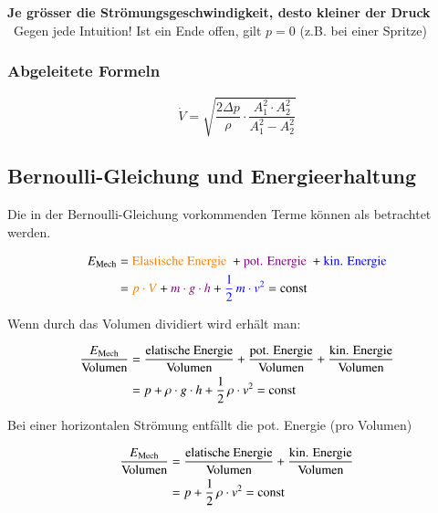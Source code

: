 \textbf{Je grösser die Strömungsgeschwindigkeit, desto kleiner der Druck} \\
\textrightarrow\ Gegen jede Intuition!
Ist ein Ende offen, gilt $p=0$ (z.B. bei einer Spritze)

\subsubsection*{Abgeleitete Formeln}

$$\dot{V} = \sqrt{\frac{2\Delta p}{\rho} \cdot \frac{A_1^2\cdot A_2^2}{A_1^2 - A_2^2}}$$

\subsection{Bernoulli-Gleichung und Energieerhaltung}

Die in der Bernoulli-Gleichung vorkommenden Terme können als  betrachtet werden.
\vspace{-0.3cm}

\begin{align*}
	E_{\rm Mech}	&= \text{\color{orange}Elastische Energie } + \text{\color{violet}pot. Energie } + \text{\color{blue}kin. Energie} \\
					&= {\color{orange}p \cdot V} + {\color{violet}m \cdot g \cdot h} + {\color{blue}\frac{1}{2} \, m \cdot v^2} = \mathop{} \! \mathrm{const}
\end{align*}

Wenn durch das Volumen dividiert wird erhält man: 

\vspace{-0.3cm}

\begin{align*}
	\frac{E_{\rm Mech}}{\text{Volumen}}	&= \frac{\text{elatische Energie}}{\text{Volumen}} + \frac{\text{pot. Energie}}{\text{Volumen}} + \frac{\text{kin. Energie}}{\text{Volumen}} \\
										&= p + \rho \cdot g \cdot h + \frac{1}{2} \, \rho \cdot v^2 = \mathop{} \! \mathrm{const}
\end{align*}

Bei einer horizontalen Strömung entfällt die pot. Energie (pro Volumen)

\vspace{-0.3cm}

\begin{align*}
	\frac{E_{\rm Mech}}{\text{Volumen}}	&= \frac{\text{elatische Energie}}{\text{Volumen}} + \frac{\text{kin. Energie}}{\text{Volumen}} \\
										&= p + \frac{1}{2} \, \rho \cdot v^2 = \mathop{} \! \mathrm{const}
\end{align*}

